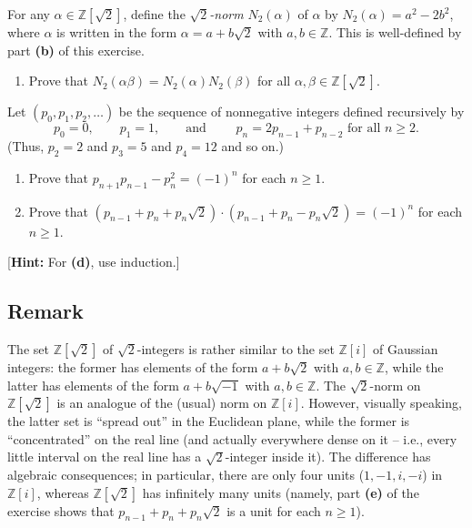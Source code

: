 \documentclass[paper=a4, fontsize=12pt]{scrartcl}%
\theoremstyle{plainsl}
\theoremstyle{definition}
\theoremstyle{remark}
\begin{document}
For any $\alpha\in\mathbb{Z}\left[  \sqrt{2}\right]  $, define the $\sqrt{2}%
$\textit{-norm} $N_{2}\left(  \alpha\right)  $ of $\alpha$ by $N_{2}\left(
\alpha\right)  =a^{2}-2b^{2}$, where $\alpha$ is written in the form
$\alpha=a+b\sqrt{2}$ with $a,b\in\mathbb{Z}$. This is well-defined by part
\textbf{(b)} of this exercise.

\begin{enumerate}
\item[\textbf{(c)}] Prove that $N_{2}\left(  \alpha\beta\right)  =
N_{2}\left(  \alpha\right)  N_{2}\left(  \beta\right)  $ for all $\alpha,
\beta\in\mathbb{Z}\left[  \sqrt2 \right]  $.
\end{enumerate}

Let $\left(  p_{0}, p_{1}, p_{2}, \ldots\right)  $ be the sequence of
nonnegative integers defined recursively by
\[
p_{0} = 0, \qquad p_{1} = 1, \qquad\text{and } \qquad p_{n} = 2p_{n-1} +
p_{n-2} \text{ for all } n \geq2.
\]
(Thus, $p_{2} = 2$ and $p_{3} = 5$ and $p_{4} = 12$ and so on.)

\begin{enumerate}
\item[\textbf{(d)}] Prove that $p_{n+1} p_{n-1} - p_{n}^{2} = \left(  -1
\right)  ^{n} $ for each $n \geq1$.

\item[\textbf{(e)}] Prove that $\left(  p_{n-1} + p_{n} + p_{n} \sqrt2
\right)  \cdot\left(  p_{n-1} + p_{n} - p_{n} \sqrt2 \right)  = \left(  -1
\right)  ^{n}$ for each $n \geq1$.
\end{enumerate}

[\textbf{Hint:} For \textbf{(d)}, use induction.]

\subsection{Remark}

The set $\mathbb{Z}\left[  \sqrt2 \right]  $ of $\sqrt2$-integers is rather
similar to the set $\mathbb{Z}\left[  i \right]  $ of Gaussian integers: the
former has elements of the form $a + b\sqrt2$ with $a, b \in\mathbb{Z}$, while
the latter has elements of the form $a + b\sqrt{-1}$ with $a, b \in\mathbb{Z}%
$. The $\sqrt2$-norm on $\mathbb{Z}\left[  \sqrt2 \right]  $ is an analogue of
the (usual) norm on $\mathbb{Z}\left[  i \right]  $. However, visually
speaking, the latter set is ``spread out'' in the Euclidean plane, while the
former is ``concentrated'' on the real line (and actually everywhere dense on
it -- i.e., every little interval on the real line has a $\sqrt2$-integer
inside it). The difference has algebraic consequences; in particular, there
are only four units ($1, -1, i, -i$) in $\mathbb{Z}\left[  i \right]  $,
whereas $\mathbb{Z}\left[  \sqrt2 \right]  $ has infinitely many units
(namely, part \textbf{(e)} of the exercise shows that $p_{n-1} + p_{n} + p_{n}
\sqrt2$ is a unit for each $n \geq1$).
\end{document}
